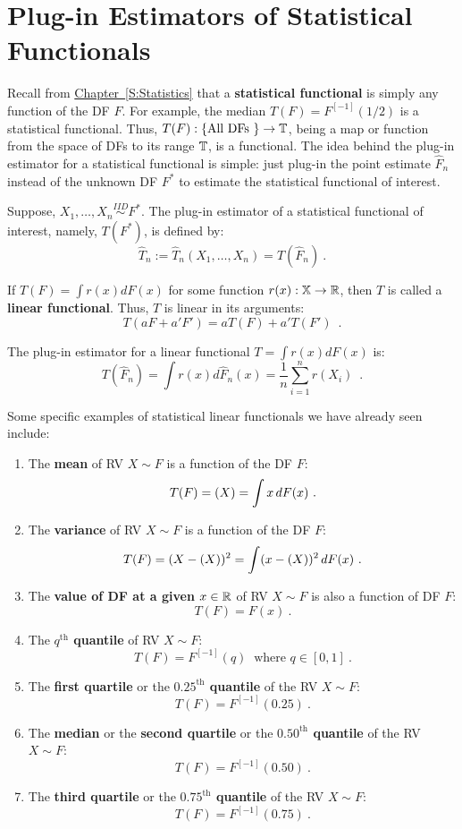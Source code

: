 \section{Plug-in Estimators of Statistical Functionals}\label{S:PlugIn}
Recall from \hyperref[S:Statistics]{Chapter~\ref*{S:Statistics}} that a {\bf statistical functional} is simply any function of the DF $F$.  For example, the median $T(F) = F^{[-1]}(1/2)$ is a statistical functional.  Thus, $T(F): \{ \text{All DFs }\} \to \mathbb{T}$, being a map or function from the space of DFs to its range $\mathbb{T}$, is a functional. 
The idea behind the plug-in estimator for a statistical functional is simple: just plug-in the point estimate $\widehat{F}_n$ instead of the unknown DF $F^*$ to estimate the statistical functional of interest.
\begin{definition}
Suppose, $X_1,\ldots,X_n \overset{IID}{\sim} F^*$.  The plug-in estimator of a statistical functional of interest, namely, $T(F^*)$, is defined by:
\[
\widehat{T}_n := \widehat{T}_n (X_1,\ldots,X_n) = T(\widehat{F}_n) \ .
\]
\end{definition}

\begin{definition}
If $T(F) = \int r(x) dF(x)$ for some function $r(x):\mathbb{X}\to \mathbb{R}$, then $T$ is called a {\bf linear functional}.  Thus, $T$ is linear in its arguments:
\[
T(a F + a' F') = a T(F) + a' T(F') \enspace .
\]
\end{definition}

\begin{prop}
The plug-in estimator for a linear functional $T = \int r(x) dF(x)$ is:
\[
\boxed{
T(\widehat{F}_n) = \int r(x) d \widehat{F}_n(x)=\frac{1}{n}\sum_{i=1}^n r(X_i) 
} \enspace .
\]
\end{prop}

Some specific examples of statistical linear functionals we have already seen include:
\begin{enumerate}
\item The {\bf mean} of RV $X \sim F$ is a function of the DF $F$:  
\[
T(F) = \E(X) = \int x\,dF(x) \ .
\]
\item The {\bf variance} of RV $X \sim F$ is a function of the DF $F$:  
\[
T(F) = \mathscr{(}X-\mathscr{(}X))^2 = \int (x-\mathscr{(}X))^2\,dF(x) \ .
\]
\item The {\bf value of DF at a given $x \in \mathbb{R}$} of RV $X \sim F$ is also a function of DF $F$:
\[
T(F) = F(x) \  .
\]
\item The {\bf $q^{\text{th}}$ quantile} of RV $X \sim F$: 
\[
T(F) = F^{[-1]}(q) \ \text{ where } q \in [0,1] \ .
\]
\item The {\bf first quartile} or the {\bf $0.25^{\text{th}}$ quantile} of the RV $X \sim F$: 
\[
T(F) = F^{[-1]}(0.25) \ .
\]
\item The {\bf median} or the {\bf second quartile} or the {\bf $0.50^{\text{th}}$ quantile} of the RV $X \sim F$: 
\[
T(F) = F^{[-1]}(0.50) \  .
\]
\item The {\bf third quartile} or the {\bf $0.75^{\text{th}}$ quantile} of the RV $X \sim F$: 
\[
T(F) = F^{[-1]}(0.75) \ .
\]
\end{enumerate}


